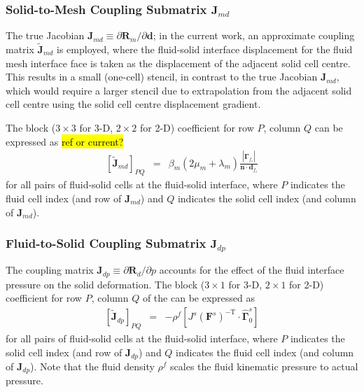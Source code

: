 \documentclass[sn-mathphys,Numbered]{sn-jnl}%
\newcommand{\bb}{\boldsymbol}
\begin{document}
\subsubsection[Solid-to-Mesh Coupling Submatrix]{Solid-to-Mesh Coupling Submatrix $\bb{J}_{md}$}
The true Jacobian $\bb{J}_{md} \equiv \partial \bb{R}_{m}/\partial \bb{d}$; in the current work, an approximate coupling matrix $\tilde{\bb{J}}_{md}$ is employed, where the fluid-solid interface displacement for the fluid mesh interface face is taken as the displacement of the adjacent solid cell centre.
This results in a small (one-cell) stencil, in contrast to the true Jacobian $\bb{J}_{md}$, which would require a larger stencil due to extrapolation from the adjacent solid cell centre using the solid cell centre displacement gradient.

The block ($3\times3$ for 3-D, $2\times2$ for 2-D) coefficient for row $P$, column $Q$ can be expressed as \hl{ref or current?}
\begin{eqnarray}
	 \left[ \tilde{\bb{J}}_{md} \right]_{PQ} &=&
		\beta_m (2\mu_m + \lambda_m)  \frac{ \left| \bb{\Gamma}_{f_i} \right| }{\bb{n} \cdot \bb{d}_{f_i}}
\end{eqnarray}
for all pairs of fluid-solid cells at the fluid-solid interface, where $P$ indicates the fluid cell index (and row of $\bb{J}_{md}$) and $Q$ indicates the solid cell index (and column of $\bb{J}_{md}$).



\subsubsection[Fluid-to-Solid Coupling Submatrix]{Fluid-to-Solid Coupling Submatrix $\bb{J}_{dp}$}
The coupling matrix $\bb{J}_{dp} \equiv \partial \bb{R}_{d}/\partial p$ accounts for the effect of the fluid interface pressure on the solid deformation. 
The block ($3\times1$ for 3-D, $2\times1$ for 2-D) coefficient for row $P$, column $Q$ of the can be expressed as
\begin{eqnarray}
	 \left[ \tilde{\bb{J}}_{dp} \right]_{PQ} &=& -\rho^f \left[ J^s (\bb{F}^s)^{-\text{T}} \cdot \hat{\bb{\Gamma}}_0^s \right] 
\end{eqnarray}
for all pairs of fluid-solid cells at the fluid-solid interface, where $P$ indicates the solid cell index (and row of $\bb{J}_{dp}$) and $Q$ indicates the fluid cell index (and column of $\bb{J}_{dp}$).
Note that the fluid density $\rho^f$ scales the fluid kinematic pressure to actual pressure.
\end{document}
